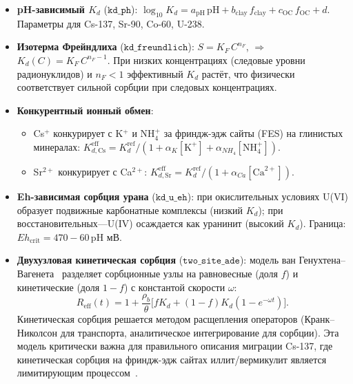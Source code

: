 \documentclass[12pt,a4paper]{article}
\begin{document}
\begin{itemize}[leftmargin=*,itemsep=2pt]
  \item \textbf{pH-зависимый $K_d$} ($\texttt{kd\_ph}$):
        $\log_{10} K_d = a_{\mathrm{pH}}\,\mathrm{pH} + b_{\mathrm{clay}}\, f_{\mathrm{clay}}
        + c_{\mathrm{OC}}\, f_{\mathrm{OC}} + d$.
        Параметры для Cs-137, Sr-90, Co-60, U-238.

  \item \textbf{Изотерма Фрейндлиха} ($\texttt{kd\_freundlich}$):
        $S = K_F\, C^{n_F}$, $\Rightarrow$ $K_d(C) = K_F\, C^{n_F - 1}$.
        При низких концентрациях (следовые уровни радионуклидов)
        и $n_F < 1$ эффективный $K_d$ растёт, что
        физически соответствует сильной сорбции при следовых
        концентрациях.

  \item \textbf{Конкурентный ионный обмен}:
        \begin{itemize}
          \item Cs$^+$ конкурирует с K$^+$ и NH$_4^+$ за
                фриндж-эдж сайты (FES) на глинистых минералах:
                $K_{d,\mathrm{Cs}}^{\mathrm{eff}} = K_d^{\mathrm{ref}}
                / (1 + \alpha_K[\mathrm{K}^+] + \alpha_{NH_4}[\mathrm{NH}_4^+])$.
          \item Sr$^{2+}$ конкурирует с Ca$^{2+}$:
                $K_{d,\mathrm{Sr}}^{\mathrm{eff}} = K_d^{\mathrm{ref}}
                / (1 + \alpha_{Ca}[\mathrm{Ca}^{2+}])$.
        \end{itemize}

  \item \textbf{Eh-зависимая сорбция урана} ($\texttt{kd\_u\_eh}$):
        при окислительных условиях U(VI) образует подвижные
        карбонатные комплексы (низкий $K_d$);
        при восстановительных---U(IV) осаждается как уранинит
        (высокий $K_d$). Граница: $Eh_{\mathrm{crit}} = 470 - 60\,\mathrm{pH}$ мВ.

  \item \textbf{Двухузловая кинетическая сорбция}
        ($\texttt{two\_site\_ade}$):
        модель ван Генухтена--Вагенета~\citep{vanGenuchten1989}
        разделяет сорбционные узлы на равновесные (доля $f$)
        и кинетические (доля $1-f$) с константой скорости $\omega$:
        \begin{equation}
          R_{\mathrm{eff}}(t) = 1 + \frac{\rho_b}{\theta}\bigl[
            f K_d + (1-f)K_d(1 - e^{-\omega t})\bigr].
          \label{eq:two_site}
        \end{equation}
        Кинетическая сорбция решается методом расщепления
        операторов (Кранк--Николсон для транспорта,
        аналитическое интегрирование для сорбции).
        Эта модель критически важна для правильного описания
        миграции Cs-137, где кинетическая сорбция на
        фриндж-эдж сайтах иллит/вермикулит является
        лимитирующим процессом~\citep{Kurikami2017, Roushdy2025}.
\end{itemize}
\end{document}
